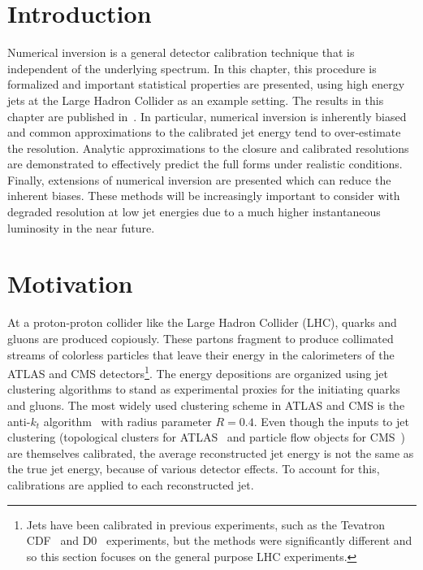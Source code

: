 \section{Introduction}
Numerical inversion is a general detector calibration technique that is independent of the underlying spectrum.
In this chapter, this procedure is formalized and important statistical properties are presented, using high energy jets at the Large Hadron Collider as an example setting.
The results in this chapter are published in~\cite{Cukierman:2016dkb}.
In particular, numerical inversion is inherently biased and common approximations to the calibrated jet energy tend to over-estimate the resolution.
Analytic approximations to the closure and calibrated resolutions are demonstrated to effectively predict the full forms under realistic conditions.
Finally, extensions of numerical inversion are presented which can reduce the inherent biases.
These methods will be increasingly important to consider with degraded resolution at low jet energies due to a much higher instantaneous luminosity in the near future.

\section{Motivation}

At a proton-proton collider like the Large Hadron Collider (LHC), quarks and gluons are produced copiously.
These partons fragment to produce collimated streams of colorless particles that leave their energy in the calorimeters of the ATLAS and CMS detectors\footnote{Jets have been calibrated in previous experiments, such as the Tevatron CDF~\cite{Bhatti:2005ai} and D0~\cite{Abazov:2013hda} experiments, but the methods were significantly different and so this section focuses on the general purpose LHC experiments.}.
The energy depositions are organized using jet clustering algorithms to stand as experimental proxies for the initiating quarks and gluons. 
The most widely used clustering scheme in ATLAS and CMS is the anti-$k_t$ algorithm~\cite{Cacciari:2008gp} with radius parameter $R=0.4$.
Even though the inputs to jet clustering (topological clusters for ATLAS~\cite{topo1,topo2} and particle flow objects for CMS~\cite{pflow1,pflow2}) are themselves calibrated, the average reconstructed jet energy is not the same as the true jet energy, because of various detector effects.
To account for this, calibrations are applied to each reconstructed jet.  

